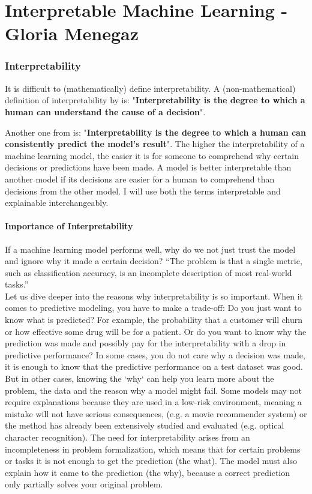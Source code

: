 \part{Interpretable Machine Learning - Gloria Menegaz}
\section{Interpretability}

It is difficult to (mathematically) define interpretability. A (non-mathematical) definition of interpretability by \cite{miller2019explanation} is:
"\textbf{Interpretability is the degree to which a human can understand the cause of a decision}".

Another one from \cite{kim2016examples} is: "\textbf{Interpretability is the degree to which a human can consistently predict the model's result}".
The higher the interpretability of a machine learning model, the easier it is for someone to comprehend
why certain decisions or predictions have been made. A model is better interpretable than another model 
if its decisions are easier for a human to comprehend than decisions from the other model. 
I will use both the terms interpretable and explainable interchangeably.
\subsection{Importance of Interpretability}
If a machine learning model performs well, why do we not just trust the model and ignore why it made a 
certain decision? “The problem is that a single metric, such as classification accuracy, is an incomplete 
description of most real-world tasks.”\\

Let us dive deeper into the reasons why interpretability is so important.
When it comes to predictive modeling, you have to make a trade-off: 
Do you just want to know what is predicted? For example, the probability that 
a customer will churn or how effective some drug will be for a patient. 
Or do you want to know why the prediction was made and possibly pay for the interpretability 
with a drop in predictive performance? In some cases, you do not care why a decision was made, 
it is enough to know that the predictive performance on a test dataset was good. But in other cases, 
knowing the `why` can help you learn more about the problem, the data and the reason why a model might fail. 
Some models may not require explanations because they are used in a low-risk environment, meaning a mistake 
will not have serious consequences, (e.g. a movie recommender system) or the method has already 
been extensively studied and evaluated (e.g. optical character recognition). 
The need for interpretability arises from an incompleteness in problem formalization, which means that 
for certain problems or tasks it is not enough to get the prediction (the what). 
The model must also explain how it came to the prediction (the why), because a correct prediction 
only partially solves your original problem.\\

